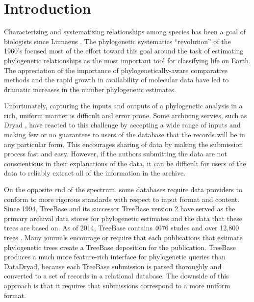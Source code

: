 \documentclass{bioinfo}
\begin{document}
\section{Introduction}

Characterizing and systematizing relationships among species has been a goal of biologists since Linnaeus \cite{Linne1758}.
The phylogenetic systematics ``revolution'' of the 1960's focused most of the effort toward this goal around the 
    task of estimating phylogenetic relationships as the most important tool for classifying life on Earth.
The appreciation of the importance of phylogenetically-aware comparative methods \citep[e.g.][]{Felsenstein1985Comp} and 
the rapid growth in availability of molecular data have led to dramatic increases in the number phylogenetic estimates.


Unfortunately, capturing the inputs and outputs of a phylogenetic analysis in a rich, uniform manner is
    difficult and error prone.
Some archiving servies, such as Dryad \citep{Dryad}, have reacted to this challenge by accepting a 
    wide range of inputs and making few or no
    guarantees to users of the database that the records will be in any particular form.
This encourages sharing of data by making the submission process fast and easy.
However, if the authors submitting the data are not conscientious in their explanations of the data, it can be difficult
    for users of the data to reliably extract all of the information in the archive.

On the opposite end of the spectrum, some databases require data providers to conform to more rigorous
    standards with respect to input format and content.
    Since 1994, TreeBase \citep{SandersonDPE1994} and its successor TreeBase version 2 \citep{TreeBase2} have served
    as the primary archival data stores for phylogenetic estimates and the data that these trees are based on.
As of 2014, TreeBase contains 4076 studes and over 12,800 trees \citep{TreeBaseWebCite}.
Many journals encourage or require that each publications that estimate phylogenetic trees create a TreeBase
    deposition for the publication.
TreeBase produces a much more feature-rich interface for phylogenetic queries than DataDryad, because each 
    TreeBase submission is parsed thoroughly and converted to a set of records in a relational database.
The downside of this approach is that it requires that submissions correspond to a more uniform format.
\end{document}
